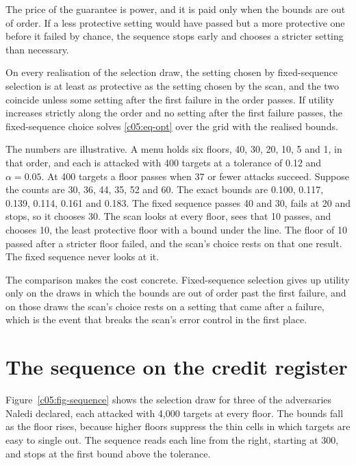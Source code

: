 The price of the guarantee is power, and it is paid only when the bounds are out of
order. If a less protective setting would have passed but a more protective one before it
failed by chance, the sequence stops early and chooses a stricter setting than necessary.

\begin{proposition}\label{c05:prop-compare}
On every realisation of the selection draw, the setting chosen by fixed-sequence
selection is at least as protective as the setting chosen by the scan, and the two
coincide unless some setting after the first failure in the order passes. If utility
increases strictly along the order and no setting after the first failure passes, the
fixed-sequence choice solves \eqref{c05:eq-opt} over the grid with the realised bounds.
\end{proposition}

\begin{example}\label{c05:ex-disagree}
The numbers are illustrative. A menu holds six floors, 40, 30, 20, 10, 5 and 1, in that
order, and each is attacked with 400 targets at a tolerance of 0.12 and $\alpha = 0.05$.
At 400 targets a floor passes when 37 or fewer attacks succeed. Suppose the counts are
30, 36, 44, 35, 52 and 60. The exact bounds are 0.100, 0.117, 0.139, 0.114, 0.161 and
0.183. The fixed sequence passes 40 and 30, fails at 20 and stops, so it chooses 30. The
scan looks at every floor, sees that 10 passes, and chooses 10, the least protective
floor with a bound under the line. The floor of 10 passed after a stricter floor failed,
and the scan's choice rests on that one result. The fixed sequence never looks at it.
\end{example}

The comparison makes the cost concrete. Fixed-sequence selection gives up utility only on
the draws in which the bounds are out of order past the first failure, and on those draws
the scan's choice rests on a setting that came after a failure, which is the event that
breaks the scan's error control in the first place.

\section{The sequence on the credit register}

Figure~\ref{c05:fig-sequence} shows the selection draw for three of the adversaries
Naledi declared, each attacked with 4,000 targets at every floor. The bounds fall as the
floor rises, because higher floors suppress the thin cells in which targets are easy to
single out. The sequence reads each line from the right, starting at 300, and stops at the
first bound above the tolerance.

